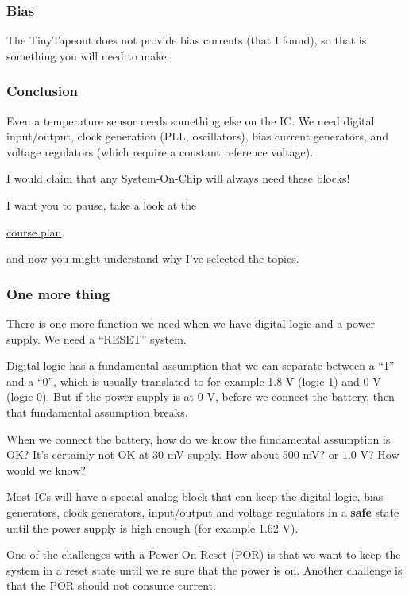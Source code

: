 \subsubsection{Bias}\label{bias}

The TinyTapeout does not provide bias currents (that I found), so that
is something you will need to make.

\subsubsection{Conclusion}\label{conclusion}

Even a temperature sensor needs something else on the IC. We need
digital input/output, clock generation (PLL, oscillators), bias current
generators, and voltage regulators (which require a constant reference
voltage).

I would claim that any System-On-Chip will always need these blocks!

I want you to pause, take a look at the

\href{https://analogicus.com/aic2026/plan/}{course plan}

and now you might understand why I've selected the topics.

\subsubsection{One more thing}\label{one-more-thing}

There is one more function we need when we have digital logic and a
power supply. We need a ``RESET'' system.

Digital logic has a fundamental assumption that we can separate between
a ``1'' and a ``0'', which is usually translated to for example 1.8 V
(logic 1) and 0 V (logic 0). But if the power supply is at 0 V, before
we connect the battery, then that fundamental assumption breaks.

When we connect the battery, how do we know the fundamental assumption
is OK? It's certainly not OK at 30 mV supply. How about 500 mV? or 1.0
V? How would we know?

Most ICs will have a special analog block that can keep the digital
logic, bias generators, clock generators, input/output and voltage
regulators in a \textbf{safe} state until the power supply is high
enough (for example 1.62 V).

One of the challenges with a Power On Reset (POR) is that we want to
keep the system in a reset state until we're sure that the power is on.
Another challenge is that the POR should not consume current.

